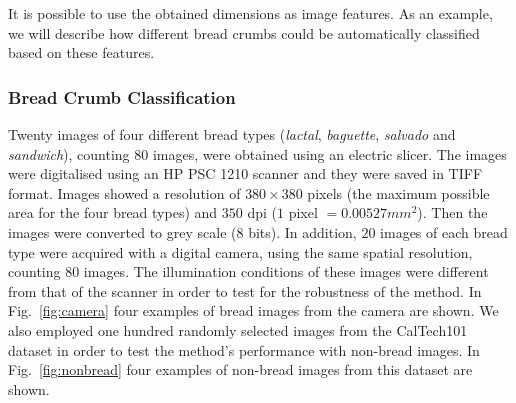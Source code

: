\documentclass[oneside,a4paper,english,links]{article}
\begin{document}
It is possible to use the obtained dimensions as image features. As an example, we will describe how different bread crumbs could be automatically classified based on these features.

\subsubsection{Bread Crumb Classification}
Twenty images of four different bread types ({\em lactal}, {\em baguette}, {\em salvado} and {\em sandwich}), counting $80$ images, were obtained using an electric slicer. The images were digitalised using an HP PSC 1210 scanner and they were saved in TIFF format. Images showed a resolution of $380 \times 380$ pixels (the maximum possible area for the four bread types) and $350$ dpi ($1$ pixel $= 0.00527 mm^{2}$). Then the images were converted to grey scale ($8$ bits). In addition, $20$ images of each bread type were acquired with a digital camera, using the same spatial resolution, counting $80$ images. The illumination conditions of these images were different from that of the scanner in order to test for the robustness of the method. In Fig.~\ref{fig:camera} four examples of bread images from the camera are shown. We also employed one hundred randomly selected images from the CalTech101~\cite{FeiFei04} dataset in order to test the method's performance with non-bread images. In Fig.~\ref{fig:nonbread} four examples of non-bread images from this dataset are shown. 
\end{document}
